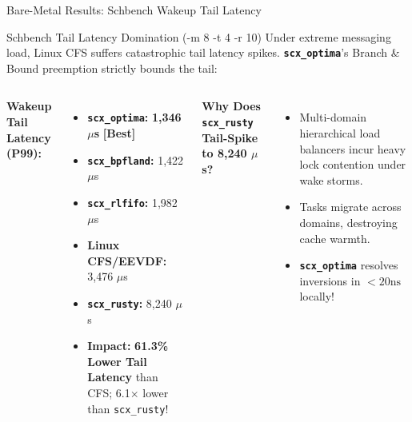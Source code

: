 \documentclass{beamer}
\begin{document}
\begin{frame}{Bare-Metal Results: Schbench Wakeup Tail Latency}
  \begin{alertblock}{Schbench Tail Latency Domination (-m 8 -t 4 -r 10)}
    \footnotesize
    Under extreme messaging load, Linux CFS suffers catastrophic tail latency spikes. \textbf{\texttt{scx\_optima}}'s Branch \& Bound preemption strictly bounds the tail:
  \end{alertblock}

  \vspace{0.15cm}
  \begin{columns}[T]
      \textbf{Wakeup Tail Latency (P99):}
      \begin{itemize}\itemsep2pt\tiny
        \item \textbf{\texttt{scx\_optima}:} \textbf{1,346 $\mu$s} \textcolor{AccentOrange}{\textbf{[Best]}}
        \item \textbf{\texttt{scx\_bpfland}:} 1,422 $\mu$s
        \item \textbf{\texttt{scx\_rlfifo}:} 1,982 $\mu$s
        \item \textbf{Linux CFS/EEVDF:} 3,476 $\mu$s
        \item \textbf{\texttt{scx\_rusty}:} 8,240 $\mu$s
        \item \textbf{Impact:} \textbf{61.3\% Lower Tail Latency} than CFS; 6.1$\times$ lower than \texttt{scx\_rusty}!
      \end{itemize}

      \textbf{Why Does \texttt{scx\_rusty} Tail-Spike to 8,240 $\mu$s?}
      \begin{itemize}\itemsep2pt\tiny
        \item Multi-domain hierarchical load balancers incur heavy lock contention under wake storms.
        \item Tasks migrate across domains, destroying cache warmth.
        \item \textbf{\texttt{scx\_optima}} resolves inversions in $<20\text{ns}$ locally!
      \end{itemize}
  \end{columns}
\end{frame}
\end{document}
